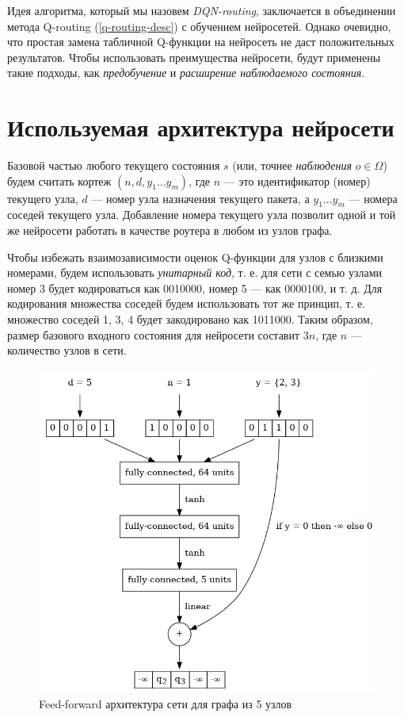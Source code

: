 \documentclass[specification, annotation]{itmo-student-thesis}
\begin{document}
Идея алгоритма, который мы назовем \textit{DQN-routing}, заключается в
объединении метода Q-routing (\ref{q-routing-desc}) с обучением нейросетей.
Однако очевидно, что простая замена табличной Q-функции на нейросеть не даст
положительных результатов. Чтобы использовать преимущества нейросети, будут
применены такие подходы, как \textit{предобучение} и \textit{расширение
  наблюдаемого состояния}.

\section{Используемая архитектура нейросети}

Базовой частью любого текущего состояния $s$ (или, точнее \textit{наблюдения}
$o \in \Omega$) будем считать кортеж $(n, d, y_1 ... y_m)$, где $n$ --- это
идентификатор (номер) текущего узла, $d$ --- номер узла назначения текущего
пакета, а $y_1 ... y_m$ --- номера соседей текущего узла. Добавление номера
текущего узла позволит одной и той же нейросети работать в качестве роутера в
любом из узлов графа.

Чтобы избежать взаимозависимости оценок Q-функции для узлов с близкими номерами, будем
использовать \textit{унитарный код}, т. е. для сети с семью узлами номер 3 будет
кодироваться как 0010000, номер 5 --- как 0000100, и т. д. Для кодирования
множества соседей будем использовать тот же принцип, т. е. множество соседей 1,
3, 4 будет закодировано как 1011000. Таким образом, размер базового входного
состояния для нейросети составит $3n$, где $n$ --- количество узлов в сети.

\begin{figure}[!h]
  \caption{Feed-forward архитектура сети для графа из 5 узлов}\label{nn-pic-ff}
  \centering
  \includegraphics[scale=0.5]{nn-1}
\end{figure}
\end{document}
